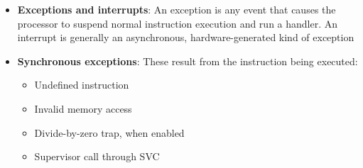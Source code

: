 \documentclass{report}
\begin{document}
\begin{itemize}
            \begin{itemize}
                \item \textbf{Thread mode:} ordinary program or task execution
                \item \textbf{Handler mode:} exception and interrupt handlers
            \end{itemize}
            Thread mode may be privileged or unprivileged. Handler mode is always privileged
            \bigbreak \noindent 
            Privileged software can perform operations such as:
            \begin{itemize}
                \item Configure the MPU
                \item Change interrupt masks
                \item Access restricted memory regions
                \item Modify important system-control registers
            \end{itemize}
            Unprivileged software is restricted.
            \bigbreak \noindent 
            The CONTROL.nPRIV bit controls Thread-mode privilege:
            \bigbreak \noindent 
            \begin{ccode}
                0 = privileged
                1 = unprivileged
            \end{ccode}
            \bigbreak \noindent 
            Privileged Thread mode can drop into unprivileged mode directly. Unprivileged Thread mode generally cannot restore its own privilege. It must request a privileged exception handler, commonly through SVC.
        \item \textbf{Exceptions and interrupts}: An exception is any event that causes the processor to suspend normal instruction execution and run a handler.
            \bigbreak \noindent 
            An interrupt is generally an asynchronous, hardware-generated kind of exception
        \item \textbf{Synchronous exceptions}: These result from the instruction being executed:
            \begin{itemize}
                \item Undefined instruction
                \item Invalid memory access
                \item Divide-by-zero trap, when enabled
                \item Supervisor call through SVC
            \end{itemize}

\end{itemize}
\end{document}
